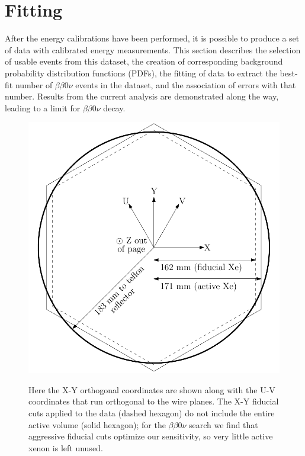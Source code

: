 \section{Fitting}\label{sec:ResultFitting}

After the energy calibrations have been performed, it is possible to produce a set of data with calibrated energy measurements.  This section describes the selection of usable events from this dataset, the creation of corresponding background probability distribution functions (PDFs), the fitting of data to extract the best-fit number of $\beta\beta 0\nu$ events in the dataset, and the association of errors with that number.  Results from the current analysis are demonstrated along the way, leading to a limit for $\beta\beta 0\nu$ decay.

\begin{figure}
\begin{center}
\includegraphics[keepaspectratio=true,width=\textwidth]{FidVolDiagram_Dissertation.pdf}
\end{center}
\renewcommand{\baselinestretch}{1}
\small\normalsize
\begin{quote}
\caption{Here the X-Y orthogonal coordinates are shown along with the U-V coordinates that run orthogonal to the wire planes.  The X-Y fiducial cuts applied to the data (dashed hexagon) do not include the entire active volume (solid hexagon); for the $\beta\beta 0\nu$ search we find that aggressive fiducial cuts optimize our sensitivity, so very little active xenon is left unused.}
\label{fig:FidVolDiagram}
\end{quote}
\end{figure}
\renewcommand{\baselinestretch}{2}
\small\normalsize

